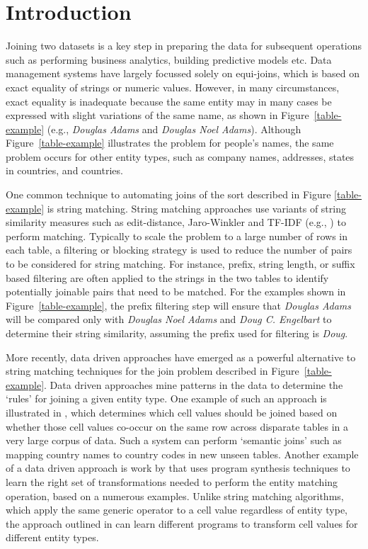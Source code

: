 \section{Introduction}

Joining two datasets is a key step in preparing the data for subsequent operations such as performing business analytics, building predictive models etc.  Data management systems have largely focussed solely on equi-joins, which is based on exact equality of strings or numeric values.  However, in many circumstances, exact equality is inadequate because the same entity may in many cases be expressed with slight variations of the same name, as shown in Figure~\ref{table-example} (e.g., \textit{Douglas Adams} and \textit{Douglas Noel Adams}).  Although Figure~\ref{table-example} illustrates the problem for people's names, the same problem occurs for other entity types, such as company names, addresses, states in countries, and countries.

One common technique to automating joins of the sort described in Figure \ref{table-example} is string matching.  String matching approaches use variants of string similarity measures such as edit-distance, Jaro-Winkler and TF-IDF (e.g., \cite{Cohen2003}) to perform matching.  Typically to scale the problem to a large number of rows in each table, a filtering or blocking strategy is used to reduce the number of pairs to be considered for string matching.  For instance, prefix, string length, or suffix based filtering are often applied to the strings in the two tables to identify potentially joinable pairs that need to be matched.  For the examples shown in Figure~\ref{table-example}, the prefix filtering step will ensure that \textit{Douglas Adams} will be compared only with \textit{Douglas Noel Adams} and \textit{Doug C. Engelbart} to determine their string similarity, assuming the prefix used for filtering is \textit{Doug}.  

More recently, data driven approaches have emerged as a powerful alternative to string matching techniques for the join problem described in Figure~\ref{table-example}.  Data driven approaches mine patterns in the data to determine the `rules' for joining a given entity type.  One example of such an approach is illustrated in \cite{He:2015:SJS:2824032.2824036}, which determines which cell values should be joined based on whether those cell values co-occur on the same row across disparate tables in a very large corpus of data.  Such a system can perform `semantic joins' such as mapping country names to country codes in new unseen tables.  Another example of a data driven approach is work by \cite{auto-join-joining-tables-leveraging-transformations} that uses program synthesis techniques to learn the right set of transformations needed to perform the entity matching operation, based on a numerous examples.  Unlike string matching algorithms, which apply the same generic operator to a cell value regardless of entity type, the approach outlined in \cite{auto-join-joining-tables-leveraging-transformations} can learn different programs to transform cell values for different entity types. 

